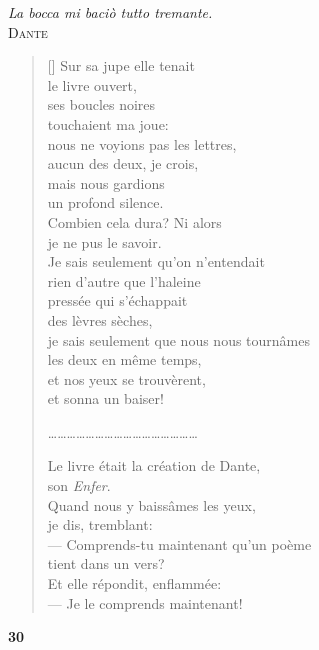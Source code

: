 \documentclass[a4paper,12pt]{book}
\begin{document}
\settowidth{\versewidth}{Je sais seulement que nous nous tournâmes}

\begin{flushright}
  \emph{La bocca mi baciò tutto tremante.}\\ \textsc{Dante}
\end{flushright}

\begin{verse}[\versewidth]
  Sur sa jupe elle tenait \\
  le livre ouvert, \\
  ses boucles noires \\
  touchaient ma joue:\\
  nous ne voyions pas les lettres, \\
  aucun des deux, je crois, \\
  mais nous gardions \\
  un profond silence. \\
  Combien cela dura? Ni alors \\
  je ne pus le savoir. \\
  Je sais seulement qu'on n'entendait \\
  rien d'autre que l'haleine \\
  pressée qui s'échappait \\
  des lèvres sèches, \\
  je sais seulement que nous nous tournâmes \\
  les deux en même temps, \\
  et nos yeux se trouvèrent, \\
  et sonna un baiser!

\ldots\ldots\ldots\ldots\ldots\ldots\ldots\ldots\ldots\ldots\ldots\ldots\ldots\ldots\ldots\ldots

  Le livre était la création de Dante, \\
  son \emph{Enfer}. \\
  Quand nous y baissâmes les yeux, \\
  je dis, tremblant: \\
  --- Comprends-tu maintenant qu'un poème \\
    tient dans un vers? \\
  Et elle répondit, enflammée: \\
  --- Je le comprends maintenant!
\end{verse}

\bigskip

\begin{center}
  \textbf{30}
\end{center}
\end{document}
